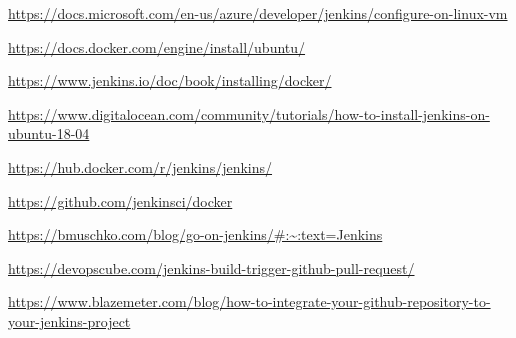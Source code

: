 \documentclass[12pt,a4paper,twoside]{article}
\begin{document}
\newpage

\begin{thebibliography}{100}



	\bibitem{} \url{https://docs.microsoft.com/en-us/azure/developer/jenkins/configure-on-linux-vm}

	\bibitem{} \url{https://docs.docker.com/engine/install/ubuntu/}

	\bibitem{} \url{https://www.jenkins.io/doc/book/installing/docker/}

	\bibitem{} \url{https://www.digitalocean.com/community/tutorials/how-to-install-jenkins-on-ubuntu-18-04}

	\bibitem{} \url{https://hub.docker.com/r/jenkins/jenkins/}

	\bibitem{} \url{https://github.com/jenkinsci/docker}


	\bibitem{} \url{https://bmuschko.com/blog/go-on-jenkins/#:~:text=Jenkins}

	\bibitem{} \url{https://devopscube.com/jenkins-build-trigger-github-pull-request/}


	\bibitem{} \url{https://www.blazemeter.com/blog/how-to-integrate-your-github-repository-to-your-jenkins-project}



\end{thebibliography}
\end{document}
